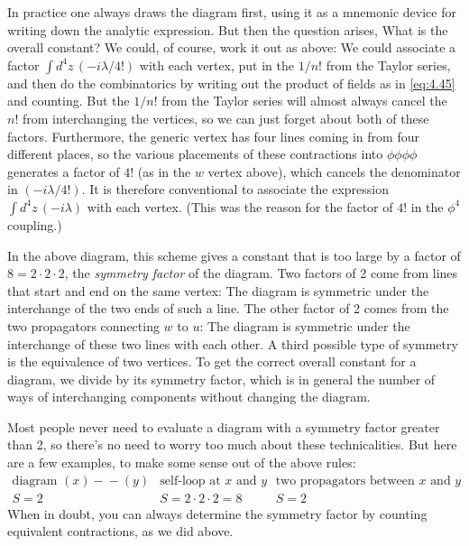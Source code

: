 In practice one always draws the diagram first, using it as a mnemonic device
for writing down the analytic expression.  But then the question arises, What
is the overall constant?  We could, of course, work it out as above: We could
associate a factor $\int d^4z\,(-i\lambda/4!)$ with each vertex, put in the
$1/n!$ from the Taylor series, and then do the combinatorics by writing out
the product of fields as in \eqref{eq:4.45} and counting.  But the $1/n!$ from
the Taylor series will almost always cancel the $n!$ from interchanging the
vertices, so we can just forget about both of these factors.  Furthermore,
the generic vertex has four lines coming in from four different places, so the
various placements of these contractions into $\phi\phi\phi\phi$ generates a
factor of $4!$ (as in the $w$ vertex above), which cancels the denominator in
$(-i\lambda/4!)$.  It is therefore conventional to associate the expression
$\int d^4z\,(-i\lambda)$ with each vertex.  (This was the reason for the
factor of $4!$ in the $\phi^4$ coupling.)

In the above diagram, this scheme gives a constant that is too large by a
factor of $8 = 2\cdot2\cdot2$, the \emph{symmetry factor} of the diagram.
Two factors of 2 come from lines that start and end on the same vertex: The
diagram is symmetric under the interchange of the two ends of such a line.
The other factor of 2 comes from the two propagators connecting $w$ to $u$:
The diagram is symmetric under the interchange of these two lines with each
other.  A third possible type of symmetry is the equivalence of two vertices.
To get the correct overall constant for a diagram, we divide by its symmetry
factor, which is in general the number of ways of interchanging components
without changing the diagram.

Most people never need to evaluate a diagram with a symmetry factor greater
than 2, so there's no need to worry too much about these technicalities.
But here are a few examples, to make some sense out of the above rules:
\begin{equation}
  \begin{array}{ccc}
    \text{diagram } (x)\!-\!-\!(y) & \text{self-loop at } x \text{ and } y &
      \text{two propagators between } x \text{ and } y\\
    S = 2 & S = 2\cdot2\cdot2 = 8 & S = 2
  \end{array}
\end{equation}
When in doubt, you can always determine the symmetry factor by counting
equivalent contractions, as we did above.

